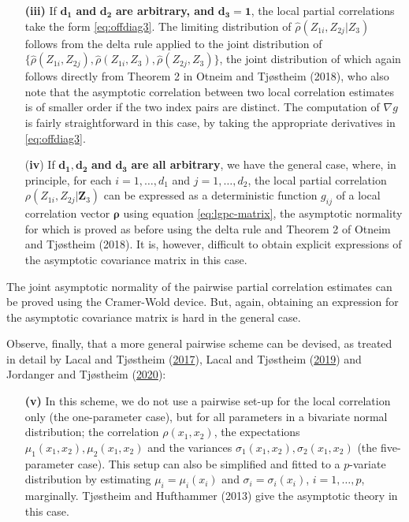 \documentclass[
  12pt,
  letterpaper]{article}
\numberwithin{equation}{section}
\newcommand{\Z}{\bm{Z}}
\newcommand{\frho}{\bm{\rho}}
\begin{document}
\begin{itemize}
\item[\textbf{(iii)}] If $\bm{d_1}$ \textbf{and} $\bm{d_2}$ \textbf{are arbitrary, and} $\bm{d_3 = 1}$, the local partial correlations take the form \eqref{eq:offdiag3}. The limiting distribution of $\widehat\rho(Z_{1i}, Z_{2j}|Z_3)$ follows from the delta rule applied to the joint distribution of $\{\widehat\rho(Z_{1i}, Z_{2j}), \widehat\rho(Z_{1i}, Z_3), \widehat\rho(Z_{2j}, Z_3)\}$, the joint distribution of which again follows directly from Theorem 2 in Otneim and Tjøstheim (2018), who also note that the asymptotic correlation between two local correlation estimates is of smaller order if the two index pairs are distinct. The computation of $\nabla g$ is fairly straightforward in this case, by taking the appropriate derivatives in \eqref{eq:offdiag3}.

\item[(\textbf{iv})] If $\bm{d_1, d_2}$ \textbf{and} $\bm{d_3}$ \textbf{are all arbitrary}, we have the general case, where, in principle, for each $i=1,\ldots,d_1$ and $j=1,\ldots,d_2$, the local partial correlation $\rho(Z_{1i}, Z_{2j}|\Z_3)$ can be expressed as a deterministic function $g_{ij}$ of a local correlation vector $\frho$ using equation \eqref{eq:lgpc-matrix}, the asymptotic normality for which is proved as before using the delta rule and Theorem 2 of Otneim and Tjøstheim (2018). It is, however, difficult to obtain explicit expressions of the asymptotic covariance matrix in this case.
\end{itemize}

The joint asymptotic normality of the pairwise partial correlation estimates can be proved using the Cramer-Wold device. But, again, obtaining an expression for the asymptotic covariance matrix is hard in the general case.

Observe, finally, that a more general pairwise scheme can be devised, as treated in detail by Lacal and Tjøstheim (\protect\hyperlink{ref-lacal2017local}{2017}), Lacal and Tjøstheim (\protect\hyperlink{ref-lacal2018estimating}{2019}) and Jordanger and Tjøstheim (\protect\hyperlink{ref-jordanger2017nonlinear}{2020}):

\begin{itemize}
\item[\textbf{(v)}] In this scheme, we do not use a pairwise set-up for the local correlation only (the one-parameter case), but for all parameters in a bivariate normal distribution; the correlation $\rho(x_1, x_2)$, the expectations $\mu_1(x_1,x_2), \mu_2(x_1,x_2)$ and the variances $\sigma_1(x_1,x_2),\sigma_2(x_1,x_2)$ (the five-parameter case). This setup can also be simplified and fitted to a $p$-variate distribution by estimating $\mu_i = \mu_i(x_i)$ and $\sigma_i = \sigma_i(x_i)$, $i=1,\ldots,p$, marginally. Tjøstheim and Hufthammer (2013) give the asymptotic theory in this case. 
\end{itemize}
\end{document}
